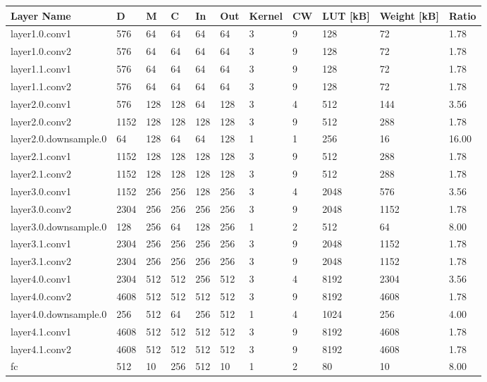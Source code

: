\begin{table}
\centering
\begin{tabular}{lllllllllll}
\toprule
Layer Name & D & M & C & In & Out & Kernel & CW & LUT [kB] & Weight [kB] & Ratio \\
\midrule
layer1.0.conv1 & 576 & 64 & 64 & 64 & 64 & 3 & 9 & 128 & 72 & 1.78 \\
layer1.0.conv2 & 576 & 64 & 64 & 64 & 64 & 3 & 9 & 128 & 72 & 1.78 \\
layer1.1.conv1 & 576 & 64 & 64 & 64 & 64 & 3 & 9 & 128 & 72 & 1.78 \\
layer1.1.conv2 & 576 & 64 & 64 & 64 & 64 & 3 & 9 & 128 & 72 & 1.78 \\
layer2.0.conv1 & 576 & 128 & 128 & 64 & 128 & 3 & 4 & 512 & 144 & 3.56 \\
layer2.0.conv2 & 1152 & 128 & 128 & 128 & 128 & 3 & 9 & 512 & 288 & 1.78 \\
layer2.0.downsample.0 & 64 & 128 & 64 & 64 & 128 & 1 & 1 & 256 & 16 & 16.00 \\
layer2.1.conv1 & 1152 & 128 & 128 & 128 & 128 & 3 & 9 & 512 & 288 & 1.78 \\
layer2.1.conv2 & 1152 & 128 & 128 & 128 & 128 & 3 & 9 & 512 & 288 & 1.78 \\
layer3.0.conv1 & 1152 & 256 & 256 & 128 & 256 & 3 & 4 & 2048 & 576 & 3.56 \\
layer3.0.conv2 & 2304 & 256 & 256 & 256 & 256 & 3 & 9 & 2048 & 1152 & 1.78 \\
layer3.0.downsample.0 & 128 & 256 & 64 & 128 & 256 & 1 & 2 & 512 & 64 & 8.00 \\
layer3.1.conv1 & 2304 & 256 & 256 & 256 & 256 & 3 & 9 & 2048 & 1152 & 1.78 \\
layer3.1.conv2 & 2304 & 256 & 256 & 256 & 256 & 3 & 9 & 2048 & 1152 & 1.78 \\
layer4.0.conv1 & 2304 & 512 & 512 & 256 & 512 & 3 & 4 & 8192 & 2304 & 3.56 \\
layer4.0.conv2 & 4608 & 512 & 512 & 512 & 512 & 3 & 9 & 8192 & 4608 & 1.78 \\
layer4.0.downsample.0 & 256 & 512 & 64 & 256 & 512 & 1 & 4 & 1024 & 256 & 4.00 \\
layer4.1.conv1 & 4608 & 512 & 512 & 512 & 512 & 3 & 9 & 8192 & 4608 & 1.78 \\
layer4.1.conv2 & 4608 & 512 & 512 & 512 & 512 & 3 & 9 & 8192 & 4608 & 1.78 \\
fc & 512 & 10 & 256 & 512 & 10 & 1 & 2 & 80 & 10 & 8.00 \\
\bottomrule
\end{tabular}
\end{table}
